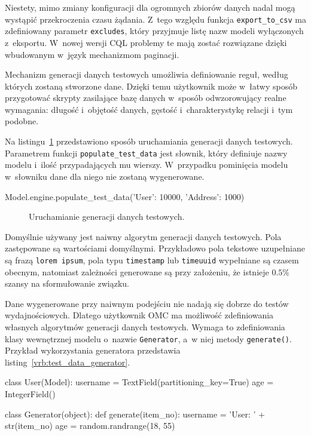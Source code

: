 Niestety, mimo zmiany konfiguracji dla ogromnych zbiorów danych nadal mogą wystąpić przekroczenia czasu żądania. Z~tego względu funkcja \verb+export_to_csv+ ma zdefiniowany parametr \verb+excludes+, który przyjmuje listę nazw modeli wyłączonych z~eksportu. W~nowej wersji CQL problemy te mają zostać rozwiązane dzięki wbudowanym w~język mechanizmom paginacji.

Mechanizm generacji danych testowych umożliwia definiowanie reguł, według których zostaną stworzone dane. Dzięki temu użytkownik może w~łatwy sposób przygotować skrypty zasilające bazę danych w~sposób odwzorowujący realne wymagania: długość i~objętość danych, gęstość i~charakterystykę relacji i~tym podobne. 

Na listingu~\ref{vrb:test_data_populatiuon} przedstawiono sposób uruchamiania generacji danych testowych. Parametrem funkcji \verb+populate_test_data+ jest słownik, który definiuje nazwy modelu i~ilość przypadających mu wierszy. W~przypadku pominięcia modelu w~słowniku dane dla niego nie zostaną wygenerowane.

\begin{verbbox}
	Model.engine.populate_test_data({'User': 10000, 'Address': 1000})
\end{verbbox}

\begin{figure}[ht!]
	\centering
	\theverbbox
	\caption{Uruchamianie generacji danych testowych.}
	\label{vrb:test_data_populatiuon}
\end{figure}

Domyślnie używany jest naiwny algorytm generacji danych testowych. Pola zastępowane są wartościami domyślnymi. Przykładowo pola tekstowe uzupełniane są frazą \verb+lorem ipsum+, pola typu \verb+timestamp+ lub \verb+timeuuid+ wypełniane są czasem obecnym, natomiast zależności generowane są przy założeniu, że istnieje $0.5\%$ szansy na sformułowanie związku. 

Dane wygenerowane przy naiwnym podejściu nie nadają się dobrze do testów wydajnościowych. Dlatego użytkownik OMC ma możliwość zdefiniowania własnych algorytmów generacji danych testowych. Wymaga to zdefiniowania klasy wewnętrznej modelu o~nazwie \verb+Generator+, a~w niej metody \verb+generate()+. Przykład wykorzystania generatora przedstawia listing~\ref{vrb:test_data_generator}.

\begin{verbbox}
	class User(Model):
	    username = TextField(partitioning_key=True)
	    age = IntegerField()

	    class Generator(object):
	        def generate(item_no):
	            username = 'User: ' + str(item_no)
	            age = random.randrange(18, 55)
\end{verbbox}

